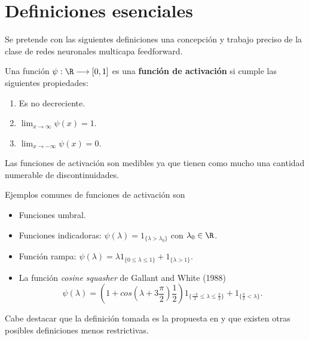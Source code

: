 %


\section{Definiciones esenciales}  

Se pretende con las siguientes definiciones una concepción y trabajo preciso de la clase de redes neuronales multicapa feedforward. 


\begin{definicion}
    Una función  $\psi: \R \longrightarrow [0,1]$ es una \textbf{ función de activación} si  cumple las siguientes propiedades:
    \begin{enumerate}[label=(\roman*)]
        \item Es no decreciente.
        \item $\lim _{x \rightarrow \infty} \psi(x) = 1
        $.
        \item $\lim _{x \rightarrow -\infty} \psi(x) = 0$.
    \end{enumerate}  

    Las funciones de activación son medibles ya que tienen como mucho una cantidad numerable de discontinuidades.
   
    Ejemplos comunes de funciones de activación son
    \begin{itemize}
        \item Funciones umbral. 

        \item Funciones indicadoras: $\psi(\lambda) = 1_{\{\lambda > \lambda_0\}}$ con $\lambda_0 \in \R$. 
        \item Función rampa: $\psi(\lambda)  = \lambda 1_{\{0 \leq \lambda \leq  1\}} + 1_{\{\lambda > 1\}}.$
    
        \item La función \textit{cosine squasher} de Gallant and White (1988)
        \begin{equation*}
    \psi(\lambda )= \left(1 + cos\left(\lambda + 3 \frac{\pi}{2} \right) \frac{1}{2}\right) 
     1_{\{\frac{-\pi}{2} \leq \lambda \leq  \frac{\pi}{2}\}}
     +
     1_{\{ \frac{\pi}{2} < \lambda \}}.
    \end{equation*}
    \end{itemize}

    Cabe destacar que la definición tomada es la propuesta en \cite{HORNIK1989359} y que existen
    otras posibles definiciones menos restrictivas.
\end{definicion}



